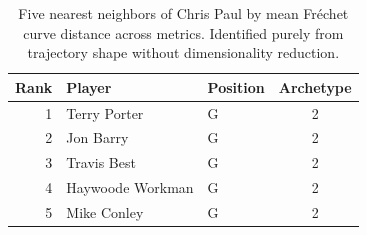 \begin{table}[htbp]
  \centering\small
  \begin{tabular}{rllc}
    \toprule
    Rank & Player & Position & Archetype \\
    \midrule
    1 & Terry Porter & G & 2 \\
    2 & Jon Barry & G & 2 \\
    3 & Travis Best & G & 2 \\
    4 & Haywoode Workman & G & 2 \\
    5 & Mike Conley & G & 2 \\
    \bottomrule
  \end{tabular}
  \caption{Five nearest neighbors of Chris Paul by mean Fr\'{e}chet curve distance across metrics. Identified purely from trajectory shape without dimensionality reduction.}
  \label{tab:Chris_Paul_frechet_curve_neighbors}
\end{table}

